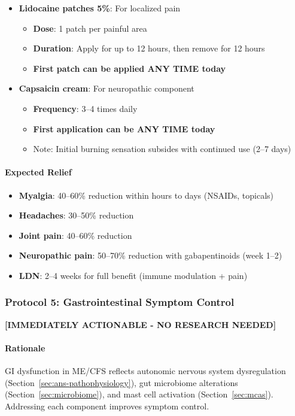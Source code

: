 \begin{enumerate}
\begin{itemize}
        \item \textbf{Lidocaine patches 5\%}: For localized pain
        \begin{itemize}
            \item \textbf{Dose}: 1 patch per painful area
            \item \textbf{Duration}: Apply for up to 12 hours, then remove for 12 hours
            \item \textbf{First patch can be applied ANY TIME today}
        \end{itemize}

        \item \textbf{Capsaicin cream}: For neuropathic component
        \begin{itemize}
            \item \textbf{Frequency}: 3--4 times daily
            \item \textbf{First application can be ANY TIME today}
            \item Note: Initial burning sensation subsides with continued use (2--7 days)
        \end{itemize}
    \end{itemize}
\end{enumerate}

\paragraph{Expected Relief}
\begin{itemize}
    \item \textbf{Myalgia}: 40--60\% reduction within hours to days (NSAIDs, topicals)
    \item \textbf{Headaches}: 30--50\% reduction
    \item \textbf{Joint pain}: 40--60\% reduction
    \item \textbf{Neuropathic pain}: 50--70\% reduction with gabapentinoids (week 1--2)
    \item \textbf{LDN}: 2--4 weeks for full benefit (immune modulation + pain)
\end{itemize}

\subsubsection{Protocol 5: Gastrointestinal Symptom Control}

\textbf{[IMMEDIATELY ACTIONABLE - NO RESEARCH NEEDED]}

\paragraph{Rationale}
GI dysfunction in ME/CFS reflects autonomic nervous system dysregulation (Section~\ref{sec:ans-pathophysiology}), gut microbiome alterations (Section~\ref{sec:microbiome}), and mast cell activation (Section~\ref{sec:mcas}). Addressing each component improves symptom control.

